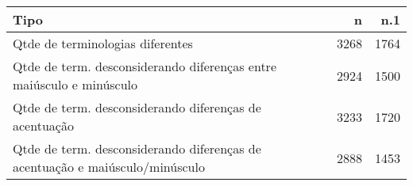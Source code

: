 \begin{table}[ht]
\centering
\begin{tabular}{lrr}
  \hline
Tipo & n & n.1 \\ 
  \hline
Qtde de terminologias diferentes & 3268 & 1764 \\ 
  Qtde de term. desconsiderando diferenças entre maiúsculo e minúsculo & 2924 & 1500 \\ 
  Qtde de term. desconsiderando diferenças de acentuação & 3233 & 1720 \\ 
  Qtde de term. desconsiderando diferenças de acentuação e
          maiúsculo/minúsculo & 2888 & 1453 \\ 
   \hline
\end{tabular}
\end{table}
